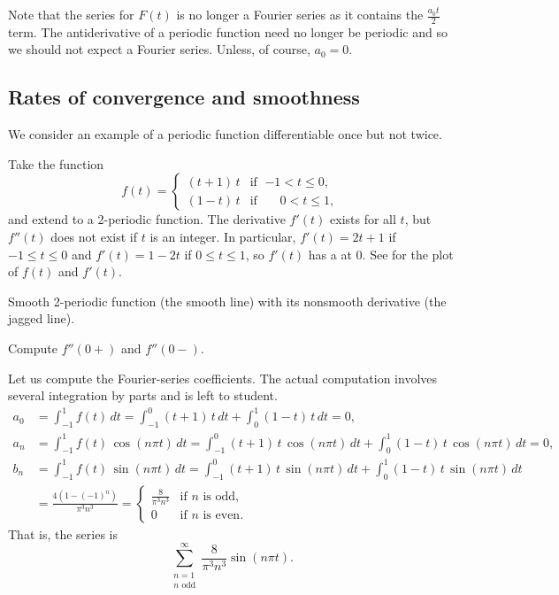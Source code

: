 Note that the series for $F(t)$ is no longer a Fourier series as it contains
the $\frac{a_0 t}{2}$ term.  The antiderivative
of a periodic function need no longer be periodic and so we should not
expect a Fourier series.  Unless, of course, $a_0 = 0$.

\subsection{Rates of convergence and smoothness}

We consider an example of a periodic function differentiable once but not
twice.

\begin{example}
Take the function
\begin{equation*}
f(t) =
\begin{cases}
(t+1)\,t & \text{if } \; {-1} < t \leq 0 , \\
(1-t)\,t & \text{if } \; \phantom{-}0 < t \leq 1 ,
\end{cases}
\end{equation*}
and extend to a
2-periodic function.
The derivative $f'(t)$ exists for all $t$, but $f''(t)$
does not exist if $t$ is an integer.
In particular,
$f'(t) = 2t+1$ if $-1 \leq t \leq 0$ and $f'(t) = 1-2t$ if
$0 \leq t \leq 1$, so $f'(t)$ has a  at $0$.
See
for the plot of $f(t)$ and $f'(t)$.


\begin{myfig}
\capstart
{}
\caption{Smooth 2-periodic function (the smooth line) with its nonsmooth derivative
(the jagged line).\label{gfs:smoothexfig}}
\end{myfig}


\begin{exercise}
Compute $f''(0+)$ and $f''(0-)$.
\end{exercise}

Let us compute the Fourier-series coefficients.  The actual computation
involves several integration by parts and is left to student.
\begin{align*}
a_0 & = 
\int_{-1}^1
f(t) \, dt = 
\int_{-1}^0
(t+1)\,t \, dt +
\int_0^1
(1-t)\,t \, dt = 0 , \\
a_n & = 
\int_{-1}^1
f(t) \, \cos (n\pi t) \, dt = 
\int_{-1}^0
(t+1)\,t
\, \cos (n \pi t) \, dt +
\int_0^1
(1-t)\,t
\, \cos (n \pi t) \, dt = 0, \\
b_n & = 
\int_{-1}^1
f(t) \, \sin (n\pi t) \, dt = 
\int_{-1}^0
(t+1)\,t
\, \sin (n \pi t) \, dt +
\int_0^1
(1-t)\,t
\, \sin (n \pi t) \, dt \\
& =
\frac{4 ( 1-{(-1)}^n)}{\pi^3 n^3} 
=
\begin{cases}
\frac{8}{\pi^3 n^3} & \text{if } n \text{ is odd} , \\
0 & \text{if } n \text{ is even} .
\end{cases}
\end{align*}
That is, the series is
\begin{equation*}
\sum_{\substack{n=1 \\ n \text{ odd}}}^\infty \frac{8}{\pi^3 n^3} \sin (n \pi t) .
\end{equation*}


\end{example}
